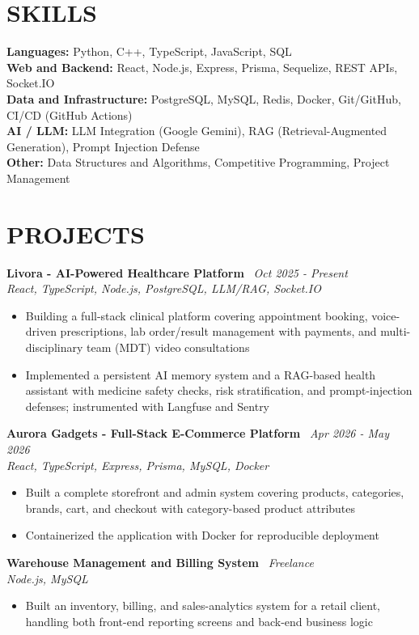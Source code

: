 \documentclass[10.5pt,a4paper]{article}
\newenvironment{tightitemize}{
  \begin{itemize}[leftmargin=15pt, itemsep=1pt, parsep=0pt, topsep=2pt]
}{
  \end{itemize}
}
\newcommand{\entrysimple}[2]{%
  \textbf{#1} \textbar\ \textit{#2}\\[1pt]
}
\begin{document}
\section*{SKILLS}
\textbf{Languages:} Python, C++, TypeScript, JavaScript, SQL\\[2pt]
\textbf{Web and Backend:} React, Node.js, Express, Prisma, Sequelize, REST APIs, Socket.IO\\[2pt]
\textbf{Data and Infrastructure:} PostgreSQL, MySQL, Redis, Docker, Git/GitHub, CI/CD (GitHub Actions)\\[2pt]
\textbf{AI / LLM:} LLM Integration (Google Gemini), RAG (Retrieval-Augmented Generation), Prompt Injection Defense\\[2pt]
\textbf{Other:} Data Structures and Algorithms, Competitive Programming, Project Management

\section*{PROJECTS}

\entrysimple{Livora - AI-Powered Healthcare Platform}{Oct 2025 - Present}
\textit{React, TypeScript, Node.js, PostgreSQL, LLM/RAG, Socket.IO}
\begin{tightitemize}
  \item Building a full-stack clinical platform covering appointment booking, voice-driven prescriptions, lab order/result management with payments, and multi-disciplinary team (MDT) video consultations
  \item Implemented a persistent AI memory system and a RAG-based health assistant with medicine safety checks, risk stratification, and prompt-injection defenses; instrumented with Langfuse and Sentry
\end{tightitemize}

\entrysimple{Aurora Gadgets - Full-Stack E-Commerce Platform}{Apr 2026 - May 2026}
\textit{React, TypeScript, Express, Prisma, MySQL, Docker}
\begin{tightitemize}
  \item Built a complete storefront and admin system covering products, categories, brands, cart, and checkout with category-based product attributes
  \item Containerized the application with Docker for reproducible deployment
\end{tightitemize}

\entrysimple{Warehouse Management and Billing System}{Freelance}
\textit{Node.js, MySQL}
\begin{tightitemize}
  \item Built an inventory, billing, and sales-analytics system for a retail client, handling both front-end reporting screens and back-end business logic
\end{tightitemize}
\end{document}
